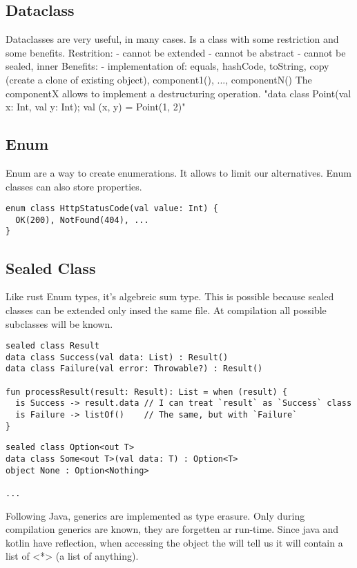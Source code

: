 \documentclass[12pt]{article}
\begin{document}
\subsection{Dataclass}
Dataclasses are very useful, in many cases. Is a class with some restriction and some benefits.
Restrition:
- cannot be extended
- cannot be abstract
- cannot be sealed, inner
Benefits:
- implementation of: equals, hashCode, toString, copy (create a clone of existing object), component1(), ..., componentN()
The componentX allows to implement a destructuring operation. "data class Point(val x: Int, val y: Int); val (x, y) = Point(1, 2)"


\subsection{Enum}
Enum are a way to create enumerations. It allows to limit our alternatives. Enum classes can also store properties.

\begin{lstlisting}
enum class HttpStatusCode(val value: Int) {
  OK(200), NotFound(404), ...
}
\end{lstlisting}

\subsection{Sealed Class}
Like rust Enum types, it's algebreic sum type. This is possible because sealed classes can be extended only insed the same file. At compilation all possible subclasses will be known.

\begin{lstlisting}
sealed class Result
data class Success(val data: List) : Result()
data class Failure(val error: Throwable?) : Result()

fun processResult(result: Result): List = when (result) {
  is Success -> result.data // I can treat `result` as `Success` class
  is Failure -> listOf()    // The same, but with `Failure`
}
\end{lstlisting}

\begin{lstlisting}
sealed class Option<out T>
data class Some<out T>(val data: T) : Option<T>
object None : Option<Nothing>

...
\end{lstlisting}

Following Java, generics are implemented as type erasure. Only during compilation generics are known, they are forgetten ar run-time. Since java and kotlin have reflection, when accessing the object the will tell us it will contain a list of <*> (a list of anything).
\end{document}
